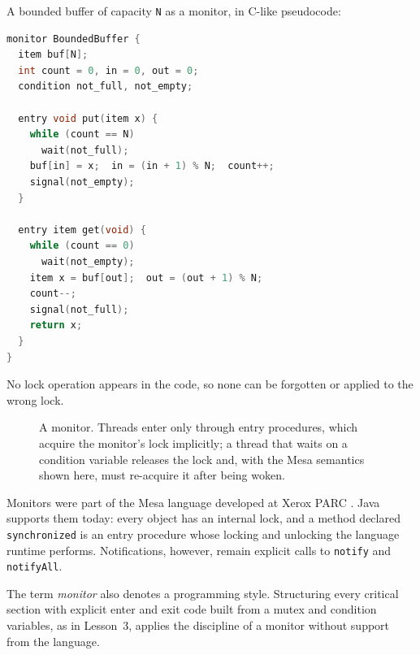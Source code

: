 \documentclass[../main.tex]{subfiles}
\begin{document}
\begin{example}
  A bounded buffer of capacity \texttt{N} as a monitor, in C-like
  pseudocode:
  \begin{lstlisting}[language=C, numbers=none]
monitor BoundedBuffer {
  item buf[N];
  int count = 0, in = 0, out = 0;
  condition not_full, not_empty;

  entry void put(item x) {
    while (count == N)
      wait(not_full);
    buf[in] = x;  in = (in + 1) % N;  count++;
    signal(not_empty);
  }

  entry item get(void) {
    while (count == 0)
      wait(not_empty);
    item x = buf[out];  out = (out + 1) % N;
    count--;
    signal(not_full);
    return x;
  }
}
\end{lstlisting}
  No lock operation appears in the code, so none can be forgotten or
  applied to the wrong lock.
\end{example}

\begin{figure}[htbp]
  \centering
  
  \caption{A monitor.  Threads enter only through entry procedures, which
    acquire the monitor's lock implicitly; a thread that waits on a
    condition variable releases the lock and, with the Mesa semantics shown
    here, must re-acquire it after being woken.}
  \label{fig:l10-monitor}
\end{figure}

Monitors were part of the Mesa language developed at Xerox PARC
\cite{lampson1980}.  Java supports them today: every object has an
internal lock, and a method declared \texttt{synchronized} is an entry
procedure whose locking and unlocking the language runtime performs.
Notifications, however, remain explicit calls to \texttt{notify} and
\texttt{notifyAll}.

The term \emph{monitor} also denotes a programming style.  Structuring
every critical section with explicit enter and exit code built from a mutex
and condition variables, as in Lesson~3, applies the discipline of a
monitor without support from the language.
\end{document}
